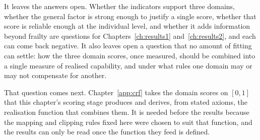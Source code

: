 It leaves the answers open. Whether the indicators support three domains, whether the general factor is strong enough to justify a single score, whether that score is reliable enough at the individual level, and whether it adds information beyond frailty are questions for Chapters~\ref{ch:results1} and~\ref{ch:results2}, and each can come back negative. It also leaves open a question that no amount of fitting can settle: how the three domain scores, once measured, should be combined into a single measure of realised capability, and under what rules one domain may or may not compensate for another.

That question comes next. Chapter~\ref{app:crf} takes the domain scores on $[0,1]$ that this chapter's scoring stage produces and derives, from stated axioms, the realisation function that combines them. It is needed before the results because the mapping and clipping rules fixed here were chosen to suit that function, and the results can only be read once the function they feed is defined.

\newpage
